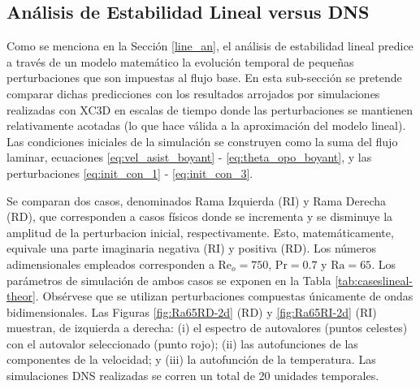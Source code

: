 \subsection{Análisis de Estabilidad Lineal versus DNS}

Como se menciona en la Sección \ref{line_an}, el análisis de estabilidad lineal predice a través de un modelo matemático la evolución temporal de pequeñas perturbaciones que son impuestas al flujo base. En esta sub-sección se pretende comparar dichas predicciones con los resultados arrojados por simulaciones realizadas con XC3D en escalas de tiempo donde las perturbaciones se mantienen relativamente acotadas (lo que hace válida a la aproximación del modelo lineal). Las condiciones iniciales de la simulación se construyen como la suma del flujo laminar, ecuaciones \ref{eq:vel_asist_boyant} - \ref{eq:theta_opo_boyant}, y las perturbaciones \ref{eq:init_con_1} - \ref{eq:init_con_3}. 

Se comparan dos casos, denominados Rama Izquierda (RI) y Rama Derecha (RD), que corresponden a casos físicos donde se incrementa y se disminuye la amplitud de la perturbacion inicial, respectivamente. Esto, matemáticamente, equivale una parte imaginaria negativa (RI) y positiva (RD). Los números adimensionales empleados corresponden a $\text{Re}_o=750$, $\text{Pr}=0\text{.}7$ y $\text{Ra}=65$. Los parámetros de simulación de ambos casos se exponen en la Tabla \ref{tab:caseslineal-theor}. Obsérvese que se utilizan perturbaciones compuestas únicamente de ondas bidimensionales. Las Figuras \ref{fig:Ra65RD-2d} (RD) y \ref{fig:Ra65RI-2d} (RI) muestran, de izquierda a derecha: (i) el espectro de autovalores (puntos celestes) con el autovalor seleccionado (punto rojo); (ii) las autofunciones de las componentes de la velocidad; y (iii) la autofunción de la temperatura. Las simulaciones DNS realizadas se corren un total de 20 unidades temporales.

\begin{table}[H]
\centering
{}
\caption{Parámetros de simulación de los dos casos elegidos.}
\label{tab:caseslineal-theor}
\end{table}

